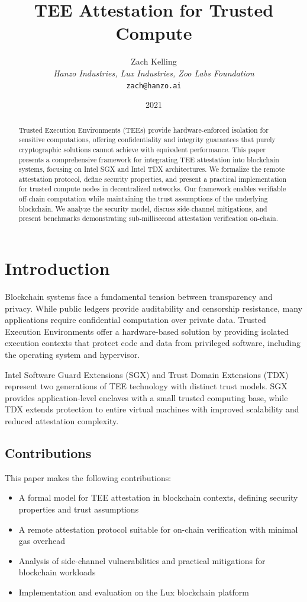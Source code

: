 \documentclass[11pt,a4paper]{article}
\title{TEE Attestation for Trusted Compute}
\author{Zach Kelling\\
\textit{Hanzo Industries, Lux Industries, Zoo Labs Foundation}\\
\texttt{zach@hanzo.ai}}
\date{2021}
\theoremstyle{definition}
\begin{document}
\maketitle

\begin{abstract}
Trusted Execution Environments (TEEs) provide hardware-enforced isolation for sensitive computations, offering confidentiality and integrity guarantees that purely cryptographic solutions cannot achieve with equivalent performance. This paper presents a comprehensive framework for integrating TEE attestation into blockchain systems, focusing on Intel SGX and Intel TDX architectures. We formalize the remote attestation protocol, define security properties, and present a practical implementation for trusted compute nodes in decentralized networks. Our framework enables verifiable off-chain computation while maintaining the trust assumptions of the underlying blockchain. We analyze the security model, discuss side-channel mitigations, and present benchmarks demonstrating sub-millisecond attestation verification on-chain.
\end{abstract}

\section{Introduction}

Blockchain systems face a fundamental tension between transparency and privacy. While public ledgers provide auditability and censorship resistance, many applications require confidential computation over private data. Trusted Execution Environments offer a hardware-based solution by providing isolated execution contexts that protect code and data from privileged software, including the operating system and hypervisor.

Intel Software Guard Extensions (SGX) and Trust Domain Extensions (TDX) represent two generations of TEE technology with distinct trust models. SGX provides application-level enclaves with a small trusted computing base, while TDX extends protection to entire virtual machines with improved scalability and reduced attestation complexity.

\subsection{Contributions}

This paper makes the following contributions:
\begin{itemize}
    \item A formal model for TEE attestation in blockchain contexts, defining security properties and trust assumptions
    \item A remote attestation protocol suitable for on-chain verification with minimal gas overhead
    \item Analysis of side-channel vulnerabilities and practical mitigations for blockchain workloads
    \item Implementation and evaluation on the Lux blockchain platform
\end{itemize}
\end{document}
